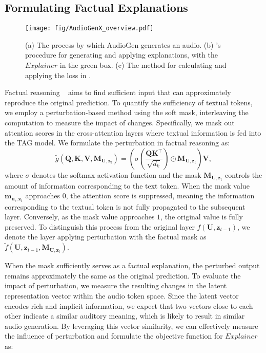 \subsection{Formulating Factual Explanations}

\begin{figure*}[!ht]
    \center
    \texttt{[image: fig/AudioGenX\_overview.pdf]}
    \caption{(a) The process by which AudioGen generates an audio. (b) \mname{}'s procedure for generating and applying explanations, with the $Explainer$ in the green box. (c) The method for calculating and applying the loss in \mname{}.}
    \label{overview}
\end{figure*}

Factual reasoning ~\cite{tan2022learning, ali2023explainable,kenny2021post} aims to find sufficient input that can approximately reproduce the original prediction. To quantify the sufficiency of textual tokens, we employ a perturbation-based method using the soft mask, interleaving the computation to measure the impact of changes. Specifically, we mask out attention scores in the cross-attention layers where textual information is fed into the TAG model. We formulate the perturbation in factual reasoning as:
\begin{equation}
\displaystyle \tilde{g}(\textbf{Q}, \textbf{K}, \textbf{V}, \textbf{M}_{\textbf{U}, \textbf{z}_{t}}) =  (\sigma(\frac{\textbf{Q}\textbf{K}^\intercal}{\sqrt{d_k}}) \odot \textbf{M}_{\textbf{U}, \textbf{z}_{t}}) \textbf{V},
\label{attx}
\end{equation}
\noindent where $\sigma$ denotes the softmax activation function and the mask $\textbf{M}_{\textbf{U}, \textbf{z}_{t}}$ controls the amount of information corresponding to the text token. When the mask value $\textbf{m}_{\textbf{u}_{i}, \textbf{z}_{t}}$ approaches $0$, the attention score is suppressed, meaning the information corresponding to the textual token is not fully propagated to the subsequent layer. Conversely, as the mask value approaches $1$, the original value is fully preserved. To distinguish this process from the original layer $f(\textbf{U}, \textbf{z}_{t-1})$, we denote the layer applying perturbation with the factual mask as $\tilde{f}(\textbf{U}, \textbf{z}_{t-1}, \textbf{M}_{\textbf{U}, \textbf{z}_{t}})$.

When the mask sufficiently serves as a factual explanation, the perturbed output remains approximately the same as the original prediction. To evaluate the impact of perturbation, we measure the resulting changes in the latent representation vector within the audio token space. Since the latent vector encodes rich and implicit information, we expect that two vectors close to each other indicate a similar auditory meaning, which is likely to result in similar audio generation. By leveraging this vector similarity, we can effectively measure the influence of perturbation and formulate the objective function for $Explainer$ as:

